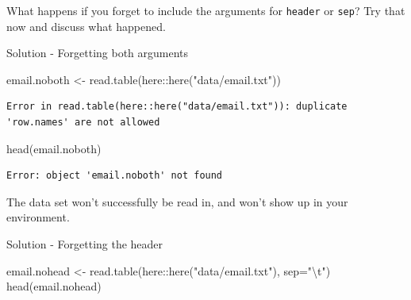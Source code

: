 \documentclass[
  letterpaper,
  DIV=11,
  numbers=noendperiod,
  oneside]{scrreprt}
\newenvironment{Shaded}{\begin{snugshade}}{\end{snugshade}}
\newcommand{\AttributeTok}[1]{\textcolor[rgb]{0.40,0.45,0.13}{#1}}
\newcommand{\FunctionTok}[1]{\textcolor[rgb]{0.28,0.35,0.67}{#1}}
\newcommand{\NormalTok}[1]{\textcolor[rgb]{0.00,0.23,0.31}{#1}}
\newcommand{\OtherTok}[1]{\textcolor[rgb]{0.00,0.23,0.31}{#1}}
\newcommand{\SpecialCharTok}[1]{\textcolor[rgb]{0.37,0.37,0.37}{#1}}
\newcommand{\StringTok}[1]{\textcolor[rgb]{0.13,0.47,0.30}{#1}}
\begin{document}
\begin{tcolorbox}[enhanced jigsaw, bottomrule=.15mm, colback=white, colframe=quarto-callout-important-color-frame, toprule=.15mm, coltitle=black, rightrule=.15mm, opacitybacktitle=0.6, colbacktitle=quarto-callout-important-color!10!white, toptitle=1mm, leftrule=.75mm, breakable, bottomtitle=1mm, titlerule=0mm, title=\textcolor{quarto-callout-important-color}{\faExclamation}\hspace{0.5em}{Errors!}, arc=.35mm, left=2mm, opacityback=0]

What happens if you forget to include the arguments for \texttt{header}
or \texttt{sep}? Try that now and discuss what happened.

Solution - Forgetting both arguments

\begin{Shaded}
\begin{Highlighting}[]
\NormalTok{email.noboth }\OtherTok{\textless{}{-}} \FunctionTok{read.table}\NormalTok{(here}\SpecialCharTok{::}\FunctionTok{here}\NormalTok{(}\StringTok{"data/email.txt"}\NormalTok{))}
\end{Highlighting}
\end{Shaded}

\begin{verbatim}
Error in read.table(here::here("data/email.txt")): duplicate 'row.names' are not allowed
\end{verbatim}

\begin{Shaded}
\begin{Highlighting}[]
\FunctionTok{head}\NormalTok{(email.noboth)}
\end{Highlighting}
\end{Shaded}

\begin{verbatim}
Error: object 'email.noboth' not found
\end{verbatim}

The data set won't successfully be read in, and won't show up in your
environment.

Solution - Forgetting the header

\begin{Shaded}
\begin{Highlighting}[]
\NormalTok{email.nohead }\OtherTok{\textless{}{-}} \FunctionTok{read.table}\NormalTok{(here}\SpecialCharTok{::}\FunctionTok{here}\NormalTok{(}\StringTok{"data/email.txt"}\NormalTok{), }\AttributeTok{sep=}\StringTok{"}\SpecialCharTok{\textbackslash{}t}\StringTok{"}\NormalTok{)}
\FunctionTok{head}\NormalTok{(email.nohead)}
\end{Highlighting}
\end{Shaded}


\end{tcolorbox}
\end{document}
